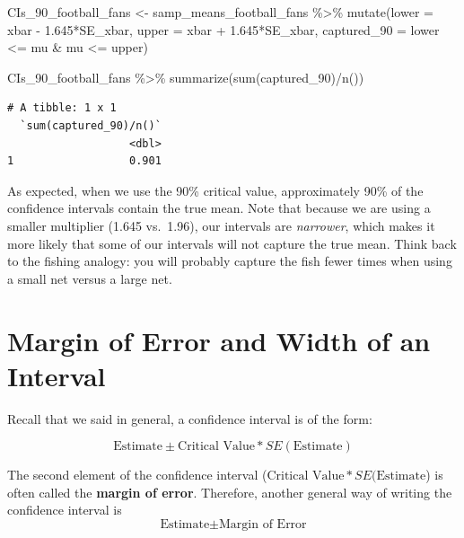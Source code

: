 \documentclass[
  letterpaper,
  DIV=11,
  numbers=noendperiod]{scrreprt}
\newenvironment{Shaded}{\begin{snugshade}}{\end{snugshade}}
\newcommand{\AttributeTok}[1]{\textcolor[rgb]{0.40,0.45,0.13}{#1}}
\newcommand{\FloatTok}[1]{\textcolor[rgb]{0.68,0.00,0.00}{#1}}
\newcommand{\FunctionTok}[1]{\textcolor[rgb]{0.28,0.35,0.67}{#1}}
\newcommand{\NormalTok}[1]{\textcolor[rgb]{0.00,0.23,0.31}{#1}}
\newcommand{\OtherTok}[1]{\textcolor[rgb]{0.00,0.23,0.31}{#1}}
\newcommand{\SpecialCharTok}[1]{\textcolor[rgb]{0.37,0.37,0.37}{#1}}
\theoremstyle{definition}
\theoremstyle{remark}
\begin{document}
\begin{Shaded}
\begin{Highlighting}[]
\NormalTok{CIs\_90\_football\_fans }\OtherTok{\textless{}{-}}\NormalTok{ samp\_means\_football\_fans }\SpecialCharTok{\%\textgreater{}\%} 
  \FunctionTok{mutate}\NormalTok{(}\AttributeTok{lower =}\NormalTok{ xbar }\SpecialCharTok{{-}} \FloatTok{1.645}\SpecialCharTok{*}\NormalTok{SE\_xbar,}
         \AttributeTok{upper =}\NormalTok{ xbar }\SpecialCharTok{+} \FloatTok{1.645}\SpecialCharTok{*}\NormalTok{SE\_xbar,}
         \AttributeTok{captured\_90 =}\NormalTok{ lower }\SpecialCharTok{\textless{}=}\NormalTok{ mu }\SpecialCharTok{\&}\NormalTok{ mu }\SpecialCharTok{\textless{}=}\NormalTok{ upper)}

\NormalTok{CIs\_90\_football\_fans }\SpecialCharTok{\%\textgreater{}\%} 
  \FunctionTok{summarize}\NormalTok{(}\FunctionTok{sum}\NormalTok{(captured\_90)}\SpecialCharTok{/}\FunctionTok{n}\NormalTok{())}
\end{Highlighting}
\end{Shaded}

\begin{verbatim}
# A tibble: 1 x 1
  `sum(captured_90)/n()`
                   <dbl>
1                  0.901
\end{verbatim}

As expected, when we use the 90\% critical value, approximately 90\% of
the confidence intervals contain the true mean. Note that because we are
using a smaller multiplier (1.645 vs.~1.96), our intervals are
\emph{narrower}, which makes it more likely that some of our intervals
will not capture the true mean. Think back to the fishing analogy: you
will probably capture the fish fewer times when using a small net versus
a large net.

\hypertarget{margin-of-error-and-width-of-an-interval}{%
\section{Margin of Error and Width of an
Interval}\label{margin-of-error-and-width-of-an-interval}}

Recall that we said in general, a confidence interval is of the form:

\[\text{Estimate} \pm \text{Critical Value} * SE(\text{Estimate})\]

The second element of the confidence interval
(\(\text{Critical Value} * SE(\text{Estimate}\)) is often called the
\textbf{margin of error}. Therefore, another general way of writing the
confidence interval is \[\text{Estimate} \pm \text{Margin of Error}\]
\end{document}
